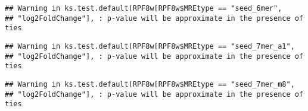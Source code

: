 \documentclass[
]{article}
\newenvironment{Shaded}{\begin{snugshade}}{\end{snugshade}}
\newcommand{\FunctionTok}[1]{\textcolor[rgb]{0.13,0.29,0.53}{\textbf{#1}}}
\newcommand{\NormalTok}[1]{#1}
\newcommand{\OtherTok}[1]{\textcolor[rgb]{0.56,0.35,0.01}{#1}}
\newcommand{\SpecialCharTok}[1]{\textcolor[rgb]{0.81,0.36,0.00}{\textbf{#1}}}
\newcommand{\StringTok}[1]{\textcolor[rgb]{0.31,0.60,0.02}{#1}}
\begin{document}
\begin{verbatim}
## Warning in ks.test.default(RPF8w[RPF8w$MREtype == "seed_6mer",
## "log2FoldChange"], : p-value will be approximate in the presence of ties
\end{verbatim}

\begin{Shaded}
\end{Shaded}

\begin{verbatim}
## Warning in ks.test.default(RPF8w[RPF8w$MREtype == "seed_7mer_a1",
## "log2FoldChange"], : p-value will be approximate in the presence of ties
\end{verbatim}

\begin{Shaded}
\end{Shaded}

\begin{verbatim}
## Warning in ks.test.default(RPF8w[RPF8w$MREtype == "seed_7mer_m8",
## "log2FoldChange"], : p-value will be approximate in the presence of ties
\end{verbatim}

\begin{Shaded}
\end{Shaded}
\end{document}

